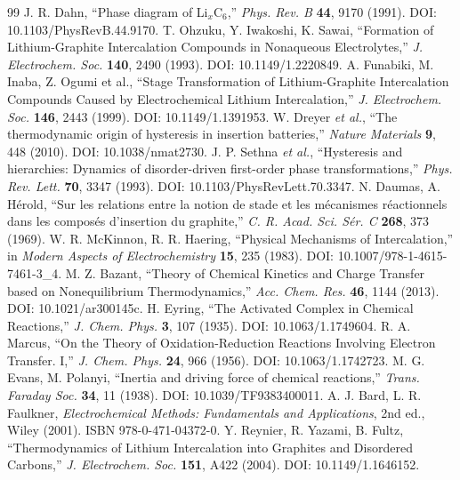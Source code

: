 \documentclass[11pt,a4paper]{article}
\begin{document}
\begin{thebibliography}{99}
 J. R. Dahn, ``Phase diagram of Li$_x$C$_6$,'' \emph{Phys. Rev. B} \textbf{44}, 9170 (1991). DOI: 10.1103/PhysRevB.44.9170.
 T. Ohzuku, Y. Iwakoshi, K. Sawai, ``Formation of Lithium-Graphite Intercalation Compounds in Nonaqueous Electrolytes,'' \emph{J. Electrochem. Soc.} \textbf{140}, 2490 (1993). DOI: 10.1149/1.2220849.
 A. Funabiki, M. Inaba, Z. Ogumi et al., ``Stage Transformation of Lithium-Graphite Intercalation Compounds Caused by Electrochemical Lithium Intercalation,'' \emph{J. Electrochem. Soc.} \textbf{146}, 2443 (1999). DOI: 10.1149/1.1391953.
 W. Dreyer \emph{et al.}, ``The thermodynamic origin of hysteresis in insertion batteries,'' \emph{Nature Materials} \textbf{9}, 448 (2010). DOI: 10.1038/nmat2730.
 J. P. Sethna \emph{et al.}, ``Hysteresis and hierarchies: Dynamics of disorder-driven first-order phase transformations,'' \emph{Phys. Rev. Lett.} \textbf{70}, 3347 (1993). DOI: 10.1103/PhysRevLett.70.3347.
 N. Daumas, A. H\'erold, ``Sur les relations entre la notion de stade et les m\'ecanismes r\'eactionnels dans les compos\'es d'insertion du graphite,'' \emph{C. R. Acad. Sci. S\'er. C} \textbf{268}, 373 (1969).
 W. R. McKinnon, R. R. Haering, ``Physical Mechanisms of Intercalation,'' in \emph{Modern Aspects of Electrochemistry} \textbf{15}, 235 (1983). DOI: 10.1007/978-1-4615-7461-3\_4.
 M. Z. Bazant, ``Theory of Chemical Kinetics and Charge Transfer based on Nonequilibrium Thermodynamics,'' \emph{Acc. Chem. Res.} \textbf{46}, 1144 (2013). DOI: 10.1021/ar300145c.
 H. Eyring, ``The Activated Complex in Chemical Reactions,'' \emph{J. Chem. Phys.} \textbf{3}, 107 (1935). DOI: 10.1063/1.1749604.
 R. A. Marcus, ``On the Theory of Oxidation-Reduction Reactions Involving Electron Transfer. I,'' \emph{J. Chem. Phys.} \textbf{24}, 966 (1956). DOI: 10.1063/1.1742723.
 M. G. Evans, M. Polanyi, ``Inertia and driving force of chemical reactions,'' \emph{Trans. Faraday Soc.} \textbf{34}, 11 (1938). DOI: 10.1039/TF9383400011.
 A. J. Bard, L. R. Faulkner, \emph{Electrochemical Methods: Fundamentals and Applications}, 2nd ed., Wiley (2001). ISBN 978-0-471-04372-0.
 Y. Reynier, R. Yazami, B. Fultz, ``Thermodynamics of Lithium Intercalation into Graphites and Disordered Carbons,'' \emph{J. Electrochem. Soc.} \textbf{151}, A422 (2004). DOI: 10.1149/1.1646152.

\end{thebibliography}
\end{document}
